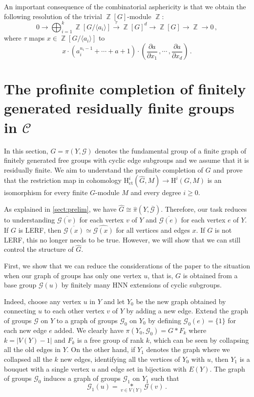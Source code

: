 \documentclass[a4paper]{amsart}
\theoremstyle{definition}
\theoremstyle{remark}
\DeclareMathOperator{\bbz}{\mathbb{Z}}
\newcommand{\G}{\mathcal G}
\newcommand{\HH}{\mathrm{H}}
\newcommand{\hpi}{\widehat{\pi}}
\begin{document}
An important consequence of the combinatorial asphericity is that we obtain the following resolution of the trivial \(\bbz[G]\)-module \(\bbz\):
\begin{equation}
    \label{resolution}
0\to \bigoplus_{i=1}^k\bbz[G/\langle a_i\rangle ]\overset{\tau}{\to}\bbz[G]^d\to \bbz[G]\to \bbz \to 0\,,
\end{equation}
where \(\tau\) maps \(x \in \bbz[G/\langle a_i\rangle]\) to \[x\cdot (a_i^{n_i-1} + \cdots +a +1)\cdot \left(\frac{\partial a}{\partial x_1}\,, \cdots \,, \frac{\partial a}{\partial x_d}\right)\,.\]

\section{The profinite completion of finitely generated residually finite groups in \texorpdfstring{\(\mathcal{C}\)}{C}}\label{sect:profcompl}

In this section, \(G = \pi(Y, \G) \) denotes the fundamental group of a finite graph of finitely generated free groups with cyclic edge subgroups and we assume that it is residually finite. We aim to understand the profinite completion of \(G\) and prove that the restriction map in cohomology \(\HH^i_{\mathrm{ct}}(\widehat{G},M) \to \HH^i(G,M)\) is an isomorphism for every finite \(G\)-module \(M\) and every degree \(i \geq 0\).

As explained in \cref{sect:prelim}, we have \(\widehat{G} \cong \hpi(Y, \overline{\G})\). Therefore, our task reduces to understanding \(\overline{\G(v)} \) for each vertex \(v\) of \(Y\) and \(\overline{\G(e)}\) for each vertex \( e \) of \( Y \). If \(G\) is LERF, then \(\overline {\G(x)}\simeq \widehat {\G(x)}\) for all vertices and edges \(x\). If \(G\) is not LERF, this no longer needs to be true. However, we will show that we can still control the structure of \(\widehat{G}\).

First, we show that we can reduce the considerations of the paper to the situation when our graph of groups has only one vertex \(u\), that is, \(G\) is obtained from a base group \(\G(u)\) by finitely many HNN extensions of cyclic subgroups. 

Indeed, choose any vertex \(u\) in \(Y\) and let \(Y_0\) be the new graph obtained by connecting \(u\) to each other vertex \(v\) of \(Y\) by adding a new edge. Extend the graph of groups \(\G\) on \(Y\) to a graph of groups \(\G_0\) on \(Y_0\) by defining \(\G_0(e) = \{1\}\) for each new edge \(e\) added. We clearly have \(\pi(Y_0,\G_0) = G * F_k\) where \(k = |V(Y)-1|\) and \(F_k\) is a free group of rank \(k\), which can be seen by collapsing all the old edges in \(Y\). On the other hand, if \(Y_1\) denotes the graph where we collapsed all the \(k\) new edges, identifying all the vertices of \(Y_0\) with \(u\), then \(Y_1\) is a bouquet with a single vertex \(u\) and edge set in bijection with \(E(Y)\). The graph of groups \(\G_0\) induces a graph of groups \(\G_1\) on \(Y_1\) such that \[\G_1(u) = \underset{v \in V(Y)}{\ast} \G(v)\,.\]
\end{document}
